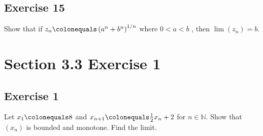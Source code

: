 \documentclass[12pt]{article}
\begin{document}
\subsection*{Exercise 15}
Show that if $z_n \colonequals \left(a^n + b^n\right)^{1/n}$ where $0 < a < b$ , then $\lim\left(z_n\right) = b$.

\section*{Section 3.3 Exercise 1}

\subsection*{Exercise 1}
Let $x_1 \colonequals 8$ and $x_{n + 1} \colonequals \frac{1}{2} x_n + 2$ for $n \in \mathbb{N}$. Show that $\left(x_n\right)$ is bounded and monotone. Find the limit.
\end{document}
